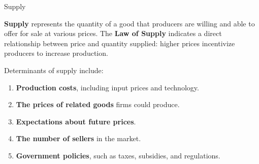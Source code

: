 \documentclass[10pt]{article}
\begin{document}
  \begin{core}{Supply}

    \textbf{Supply} represents the quantity of a good that producers are willing and able to offer for sale at various prices. The \textbf{Law of Supply} indicates a direct relationship between price and quantity supplied: higher prices incentivize producers to increase production.


    Determinants of supply include:

    \begin{enumerate}

      \item \textbf{Production costs}, including input prices and technology.

      \item \textbf{The prices of related goods} firms could produce.

      \item \textbf{Expectations about future prices}.

      \item \textbf{The number of sellers} in the market.

      \item \textbf{Government policies}, such as taxes, subsidies, and regulations.

    \end{enumerate}

  \end{core}
\end{document}
